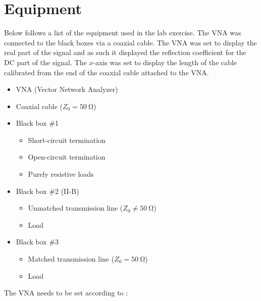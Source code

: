 \documentclass[12pt,a4paper]{article}
\begin{document}
\section{Equipment}\label{sec:equip}
Below follows a list of the equipment used in the lab exercise. The VNA was connected to the black boxes via a coaxial cable. The VNA was set to display the real part of the signal and as such it displayed the reflection coefficient for the DC part of the signal. The $x$-axis was set to display the length of the cable calibrated from the end of the coaxial cable attached to the VNA.
\begin{itemize}
\item VNA (Vector Network Analyzer)
\item Coaxial cable ($Z_{0}=\SI{50}{\ohm}$)
\item Black box \#1
  \begin{itemize}
  \item Short-circuit termination
  \item Open-circuit termination
  \item Purely resistive loads
  \end{itemize}
\item Black box \#2 (II-B)
  \begin{itemize}
  \item Unmatched transmission line ($Z_{0}\neq\SI{50}{\ohm}$)
  \item Load
  \end{itemize}
\item Black box \#3
  \begin{itemize}
  \item Matched transmission line ($Z_{0}=\SI{50}{\ohm}$)
  \item Load
  \end{itemize}
\end{itemize}
The VNA needs to be set according to \cite{labpm}:
\end{document}

